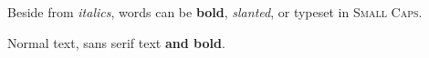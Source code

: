 \documentclass{article}
\begin{document}
Beside from {\itshape italics}, words can be
{\bfseries bold}, {\slshape slanted}, or typeset
in {\scshape Small Caps}.

Normal text, {\sffamily sans serif text {\bfseries and bold}}.
\end{document}
